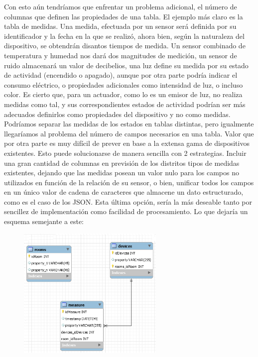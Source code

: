 \vspace{1.5cm}

Con esto aún tendríamos que enfrentar un problema adicional, el número de columnas que definen las propiedades de una tabla. El ejemplo más claro es la tabla de medidas. Una medida, efectuada por un sensor será definida por su identificador y la fecha en la que se realizó, ahora bien, según la naturaleza del dispositivo, se obtendrán disantos tiempos de medida. Un sensor combinado de temperatura y humedad nos dará dos magnitudes de medición, un sensor de ruido almacenará un valor de decibelios, una luz define su medida por su estado de actividad (encendido o apagado), aunque por otra parte podría indicar el consumo eléctrico, o propiedades adicionales como intensidad de luz, o incluso color. Es cierto que, para un actuador, como lo es un emisor de luz, no realiza medidas como tal, y sus correspondientes estados de actividad podrían ser más adecuados definirlos como propiedades del dispositivo y no como medidas. Podríamos separar las medidas de los estados en tablas distintas, pero igualmente llegaríamos al problema del número de campos necesarios en una tabla. Valor que por otra parte es muy difícil de prever en base a la extensa gama de dispositivos existentes. Esto puede solucionarse de manera sencilla con 2 estrategias. Incluir una gran cantidad de columnas en previsión de los distritos tipos de medidas existentes, dejando que las medidas posean un valor nulo para los campos no utilizados en función de la relación de su sensor, o bien, unificar todos los campos en un único valor de cadena de caracteres que almacene un dato estructurado, como es el caso de los JSON. Esta última opción, sería la más deseable tanto por sencillez de implementación como facilidad de procesamiento. Lo que dejaría un esquema semejante a este:

\begin{figure}[hbt!]
\centering
\includegraphics[height=2.5in]{figures/SQLSchemaExample_3.png}
\end{figure}

